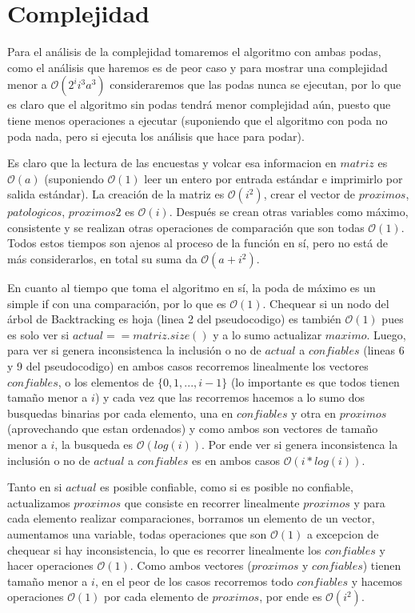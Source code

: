 \documentclass[A4paper,oneside,fleqn,10pt]{article}
\theoremstyle{definition}
\begin{document}
\section{Complejidad}
Para el análisis de la complejidad tomaremos el algoritmo con ambas podas, como el análisis que haremos es de peor caso y para mostrar una complejidad menor a $\mathcal{O} (2^i i^3 a^3)$ consideraremos que las podas nunca se ejecutan, por lo que es claro que el algoritmo sin podas tendrá menor complejidad aún, puesto que tiene menos operaciones a ejecutar (suponiendo que el algoritmo con poda no poda nada, pero si ejecuta los análisis que hace para podar).

Es claro que la lectura de las encuestas y volcar esa informacion en $matriz$ es $\mathcal{O} (a)$ (suponiendo $\mathcal{O} (1)$ leer un entero por entrada estándar e imprimirlo por salida estándar). La creación de la matriz es $\mathcal{O} (i^2)$, crear el vector de $proximos$, $patologicos$, $proximos2$ es $\mathcal{O} (i)$. Después se crean otras variables como máximo, consistente y se realizan otras operaciones de comparación que son todas $\mathcal{O} (1)$. Todos estos tiempos son ajenos al proceso de la función en sí, pero no está de más considerarlos, en total su suma da $\mathcal{O} (a+i^2)$.

En cuanto al tiempo que toma el algoritmo en sí, la poda de máximo es un simple if con una comparación, por lo que es $\mathcal{O} (1)$. Chequear si un nodo del árbol de Backtracking es hoja (linea 2 del pseudocodigo) es también $\mathcal{O} (1)$ pues es solo ver si $actual==matriz.size()$ y a lo sumo actualizar $maximo$. Luego, para ver si genera inconsistenca la inclusión o no de $actual$ a $confiables$ (lineas 6 y 9 del pseudocodigo) en ambos casos recorremos linealmente los vectores $confiables$, o los elementos de $\{0,1,...,i-1\}$ (lo importante es que todos tienen tamaño menor a $i$) y cada vez que las recorremos hacemos a lo sumo dos busquedas binarias por cada elemento, una en $confiables$ y otra en $proximos$ (aprovechando que estan ordenados) y como ambos son vectores de tamaño menor a $i$, la busqueda es $\mathcal{O} (log(i))$. Por ende ver si genera inconsistenca la inclusión o no de $actual$ a $confiables$  es en ambos casos $\mathcal{O} (i*log(i))$.

Tanto en si $actual$ es posible confiable, como si es posible no confiable, actualizamos $proximos$ que consiste en recorrer linealmente $proximos$ y para cada elemento realizar comparaciones, borramos un elemento de un vector, aumentamos una variable, todas operaciones que son $\mathcal{O} (1)$ a excepcion de chequear si hay inconsistencia, lo que  es recorrer linealmente los $confiables$ y hacer operaciones $\mathcal{O} (1)$. Como ambos vectores ($proximos$ y $confiables$) tienen tamaño menor a $i$, en el peor de los casos recorremos todo $confiables$ y hacemos operaciones $\mathcal{O} (1)$  por cada elemento de $proximos$, por ende es $\mathcal{O} (i^2)$.
\end{document}
